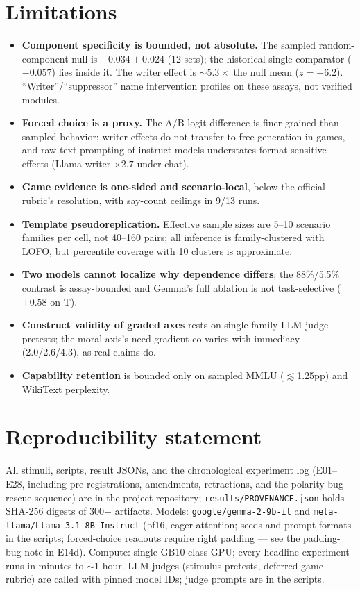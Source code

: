\documentclass{article}
\begin{document}
\section{Limitations}
\begin{itemize}
  \item \textbf{Component specificity is bounded, not absolute.} The sampled
        random-component null is $-0.034\pm0.024$ (12 sets); the historical
        single comparator ($-0.057$) lies inside it. The writer effect is
        $\sim$$5.3\times$ the null mean ($z=-6.2$). ``Writer''/``suppressor''
        name intervention profiles on these assays, not verified modules.
  \item \textbf{Forced choice is a proxy.} The A/B logit difference is finer
        grained than sampled behavior; writer effects do not transfer to
        free generation in games, and raw-text prompting of instruct models
        understates format-sensitive effects (Llama writer $\times2.7$ under
        chat).
  \item \textbf{Game evidence is one-sided and scenario-local}, below the
        official rubric's resolution, with say-count ceilings in 9/13 runs.
  \item \textbf{Template pseudoreplication.} Effective sample sizes are
        5--10 scenario families per cell, not 40--160 pairs; all inference is
        family-clustered with LOFO, but percentile coverage with 10 clusters
        is approximate.
  \item \textbf{Two models cannot localize why dependence differs}; the
        88\%/5.5\% contrast is assay-bounded and Gemma's full ablation is not
        task-selective ($+0.58$ on T).
  \item \textbf{Construct validity of graded axes} rests on single-family
        LLM judge pretests; the moral axis's need gradient co-varies with
        immediacy (2.0/2.6/4.3), as real claims do.
  \item \textbf{Capability retention} is bounded only on sampled MMLU
        ($\lesssim$1.25pp) and WikiText perplexity.
\end{itemize}

\section*{Reproducibility statement}
All stimuli, scripts, result JSONs, and the chronological experiment log
(E01--E28, including pre-registrations, amendments, retractions, and the
polarity-bug rescue sequence) are in
the project repository; \texttt{results/PROVENANCE.json} holds SHA-256
digests of 300+ artifacts. Models: \texttt{google/gemma-2-9b-it} and
\texttt{meta-llama/Llama-3.1-8B-Instruct} (bf16, eager attention; seeds and
prompt formats in the scripts; forced-choice readouts require right padding —
see the padding-bug note in E14d). Compute: single GB10-class GPU;
every headline experiment runs in minutes to $\sim$1 hour. LLM judges
(stimulus pretests, deferred game rubric) are called with pinned model IDs;
judge prompts are in the scripts.
\end{document}
